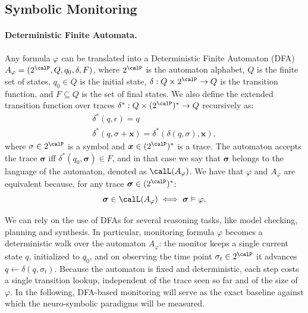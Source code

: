 \subsection{Symbolic Monitoring}
\label{sec:symbolic}

\paragraph{Deterministic Finite Automata.}
Any \ltlf formula $\varphi$ can be translated into a Deterministic Finite Automaton (DFA) \cite{LTLf} $A_\varphi = (2^\calP, Q, q_0, \delta, F)$, where $2^\calP$ is the automaton alphabet, $Q$ is the finite set of states, $q_0 \in Q$ is the initial state, $\delta: Q \times 2^\calP \rightarrow Q$ is the transition function, and $F \subseteq Q$ is the set of final states. 
We also define the extended transition function over traces $\delta^*: Q \times (2^\calP)^* \rightarrow Q$ recursively as:
\begin{equation}
\begin{array}{l}
\delta^*(q,\epsilon) = q \\
\delta^*(q, \sigma+\boldsymbol{x}) = \delta^*(\delta(q,\sigma) , \boldsymbol{x}),
\end{array}
\end{equation}
where $\sigma \in 2^\calP$ is a symbol and $\boldsymbol{x} \in (2^\calP)^*$ is a trace.  
The automaton accepts the trace $\boldsymbol{\sigma}$ iff $\delta^*(q_0, \boldsymbol{\sigma}) \in F$, and in that case we say that $\boldsymbol{\sigma}$ belongs to the language of the automaton, denoted as $\calL(A_\varphi)$.  
We have that $\varphi$ and $A_\varphi$ are equivalent because, for any trace $\boldsymbol{\sigma} \in (2^\calP)^*$:
\begin{equation}
\boldsymbol{\sigma}\in \calL(A_\varphi) \iff\boldsymbol{\sigma}\vDash\varphi.
\end{equation}

We can rely on the use of DFAs for several reasoning tasks, like model checking, planning and synthesis. In particular, monitoring formula $\varphi$ becomes a deterministic walk over the automaton $A_\varphi$: the monitor keeps a single current state $q$, initialized to $q_0$, and on observing the time point $\sigma_t \in 2^\calP$ it advances $q \leftarrow \delta(q, \sigma_t)$. Because the automaton is fixed and deterministic, each step costs a single transition lookup, independent of the trace seen so far and of the size of $\varphi$. In the following, DFA-based monitoring will serve as the exact baseline against which the neuro-symbolic paradigms will be measured.

